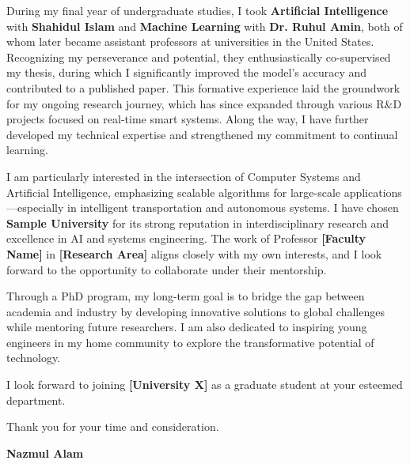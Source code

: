 \documentclass[11pt]{article}
\begin{document}
During my final year of undergraduate studies, I took \textbf{Artificial Intelligence} with \textbf{Shahidul Islam}
and \textbf{Machine Learning} with \textbf{Dr. Ruhul Amin}, both of whom later became assistant professors
at universities in the United States.
Recognizing my perseverance and potential, they enthusiastically co-supervised my thesis, during which I significantly
improved the model’s accuracy and contributed to a published paper.
This formative experience laid the groundwork for my ongoing research journey, which has since expanded through various R\&D projects
focused on real-time smart systems.
Along the way, I have further developed my technical expertise and strengthened my commitment to continual learning.

I am particularly interested in the intersection of Computer Systems and Artificial Intelligence, emphasizing scalable algorithms
for large-scale applications—especially in intelligent transportation and autonomous systems.
I have chosen \textbf{Sample University} for its strong reputation in interdisciplinary research and excellence in AI and systems engineering.
The work of Professor \textbf{[Faculty Name]} in \textbf{[Research Area]} aligns closely with my own interests,
and I look forward to the opportunity to collaborate under their mentorship.

Through a PhD program, my long-term goal is to bridge the gap between academia and industry
by developing innovative solutions to global challenges while mentoring future researchers.
I am also dedicated to inspiring young engineers in my home community to explore the transformative potential of technology.

I look forward to joining \textbf{[University X]} as a graduate student at your esteemed department.

\begin{flushleft}
    Thank you for your time and consideration.
\end{flushleft}

\textbf{Nazmul Alam}
\end{document}
